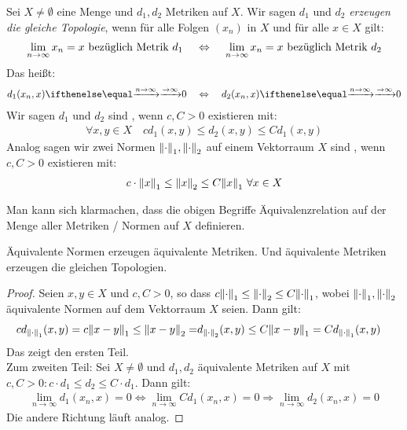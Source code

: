 \begin{Definition}{%
Sei $X \neq \emptyset$ eine Menge und $d_1,d_2$ Metriken auf $X$. 
Wir sagen $d_1$ und $d_2$ \emph{erzeugen die gleiche Topologie}, wenn für alle 
Folgen $(x_n)$ in $X$ und für alle $x\in X$ gilt:
\begin{align*}
	\lim\limits_{n \rightarrow \infty}{x_n} = x \text{ bezüglich Metrik } d_1 
	\quad \,\Leftrightarrow\, \quad \lim\limits_{n \rightarrow \infty}{ x_n = x }\text{ bezüglich 
		Metrik } d_2
\end{align*}
Das heißt: 
\begin{align*}
	d_1(x_n,x) \toinfty 0 \quad \Leftrightarrow \quad  d_2(x_n,x) \toinfty 0
\end{align*}
Wir sagen $d_1$ und $d_2$ sind , wenn $c,C > 0$ existieren mit:
\begin{align*}
	\forall x,y \in X \quad c d_1(x,y) \leq d_2(x,y) \leq C d_1(x,y) 
\end{align*}
Analog sagen wir zwei Normen $\norm{\cdot}_1, \norm{\cdot}_2$ auf einem Vektorraum 
$X$ sind , wenn $c,C > 0$ existieren mit:
\begin{align*}
	c \cdot \norm{x}_1 \leq \norm{x}_2 \leq C \norm{x}_1 \text{ } \forall x \in X
\end{align*}
}\end{Definition}

\begin{Bemerkung}{
	Man kann sich klarmachen, dass die obigen Begriffe Äquivalenzrelation auf der 
	Menge aller Metriken / Normen auf $X$ definieren.
}\end{Bemerkung}

\begin{Proposition}{%
	Äquivalente Normen erzeugen äquivalente Metriken. Und äquivalente Metriken 
	erzeugen die gleichen Topologien.
}\end{Proposition}

\begin{proof}
	Seien $x,y \in X$ und $c,C > 0$, so dass $c \norm{\cdot}_1 \leq \norm{\cdot}_2 
	\leq C \norm{\cdot}_1$, wobei $\norm{\cdot}_1, \norm{\cdot}_2$ 
	äquivalente Normen auf dem Vektorraum $X$ seien.
	Dann gilt:
	\begin{align*}
		c d_{\norm{\cdot}_1}(x,y) = c \norm{x-y}_1 \leq \norm{x-y}_2 
		= & d_{\norm{\cdot}_2}(x,y) \leq C \norm{x-y}_1 = C d_{\norm{\cdot}_1}(x,y)
	\end{align*}
	Das zeigt den ersten Teil.\\
	Zum zweiten Teil: Sei $X \neq \emptyset$ und $d_1,d_2$ äquivalente Metriken auf 
	$X$ mit \\$c,C > 0: c\cdot d_1  \leq d_2 \leq C\cdot d_1$.
	Dann gilt: 
	\begin{align*}
		\lim\limits_{n \rightarrow \infty}{d_1(x_n,x) = 0} \Leftrightarrow 
		\lim\limits_{n\rightarrow\infty}{C d_1(x_n,x) = 0}
		\Rightarrow \lim\limits_{n \rightarrow \infty}{d_2(x_n,x) = 0}
	\end{align*}
	Die andere Richtung läuft analog.
\end{proof}

